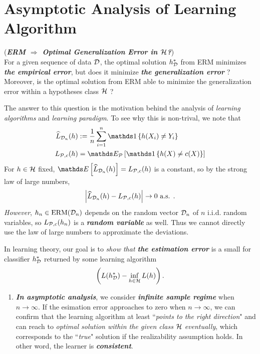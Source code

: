 \documentclass[11pt]{article}
\begin{document}
\section{Asymptotic Analysis of Learning Algorithm}
 \begin{remark} (\textbf{\emph{ERM $\Rightarrow$ Optimal Generalization Error in ${\mathcal H}$?}}) \\
 For a given sequence of data ${\mathcal D}$, the optimal solution $h^{*}_{{\mathcal D}}$ from ERM minimizes \emph{\textbf{the empirical error}}, but does it minimize \emph{\textbf{the generalization error}} ? Moreover, is the optimal solution from ERM able to minimize the generalization error within a hypotheses class ${\mathcal H}$ ?

The answer to this question is the motivation behind the analysis of \emph{learning algorithms} and \emph{learning paradigm}. To see why this is non-trival, we note that 
\begin{align*}
\widehat{L}_{\cD_n}(h) &:=  \frac{1}{n}\sum_{i=1}^{n}\ind{h(X_i)\neq Y_i}  \\
L_{\cP, c}(h)  &=  \E{\cP}{\ind{h(X)\neq c(X)}} 
\end{align*} For $h \in {\mathcal H}$ fixed,  $\E{}{\widehat{L}_{\cD_n}(h)} = L_{\cP, c}(h)$ is a constant,  so by the strong law of large numbers, 
\begin{align*}
\left\lvert \widehat{L}_{{\mathcal D}_n}(h) - L_{{\mathcal P}, c}(h) \right\rvert \to 0 \text{ a.s. }.
\end{align*} \emph{However}, $h_n \in \text{ERM}({\mathcal D}_n)$ depends on the random vector ${\mathcal D}_n$ of $n$ i.i.d. random variables, so $L_{{\mathcal P}, c}(h_n)$ is a \textbf{\emph{random variable}} as well. Thus we cannot directly use the law of large numbers to approximate the deviations.

In learning theory, our goal is to \emph{show that \textbf{the estimation error}} is a small for classifier $h_{{\mathcal D}}^{*}$ returned by some learning algorithm
\begin{align*}
\left(L(h_{{\mathcal D}}^{*})  - \inf_{h \in {\mathcal H}}L(h)\right).
\end{align*} 
\begin{enumerate}
\item \emph{\textbf{In asymptotic analysis}}, we consider \emph{\textbf{infinite sample regime}} when $n \to \infty$. If the esimation error approaches to zero when $n \to \infty$, we can confirm that the learning algorithm at least ``\emph{points to the right direction}" and can reach to \emph{optimal solution within the given class} ${\mathcal H}$ \emph{eventually}, which corresponds to the ``\emph{true}" solution if the realizability assumption holds. In other word, the learner is \emph{\textbf{consistent}}. 


\end{enumerate}
\end{remark}
\end{document}
